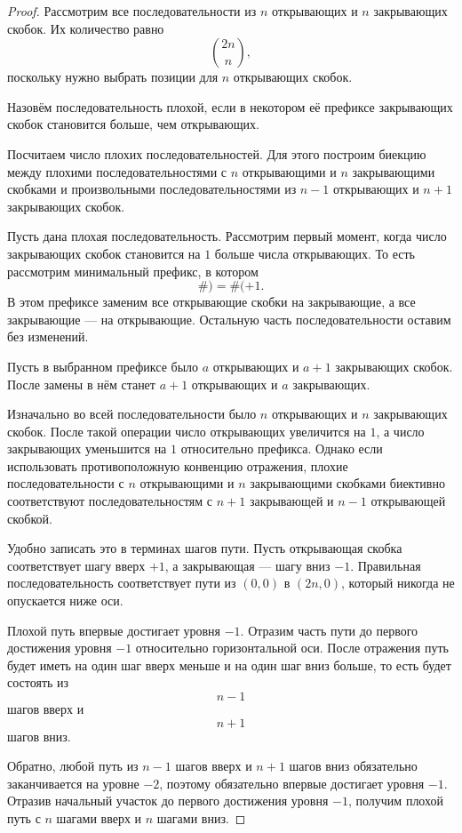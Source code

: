 \documentclass[12pt,a4paper]{article}
\begin{document}
\begin{proof}
Рассмотрим все последовательности из $n$ открывающих и $n$ закрывающих скобок. Их количество равно
\[
\binom{2n}{n},
\]
поскольку нужно выбрать позиции для $n$ открывающих скобок.

Назовём последовательность плохой, если в некотором её префиксе закрывающих скобок становится больше, чем открывающих.

Посчитаем число плохих последовательностей. Для этого построим биекцию между плохими последовательностями с $n$ открывающими и $n$ закрывающими скобками и произвольными последовательностями из $n-1$ открывающих и $n+1$ закрывающих скобок.

Пусть дана плохая последовательность. Рассмотрим первый момент, когда число закрывающих скобок становится на $1$ больше числа открывающих. То есть рассмотрим минимальный префикс, в котором
\[
\#)=\#(+1.
\]
В этом префиксе заменим все открывающие скобки на закрывающие, а все закрывающие --- на открывающие. Остальную часть последовательности оставим без изменений.

Пусть в выбранном префиксе было $a$ открывающих и $a+1$ закрывающих скобок. После замены в нём станет $a+1$ открывающих и $a$ закрывающих.

Изначально во всей последовательности было $n$ открывающих и $n$ закрывающих скобок. После такой операции число открывающих увеличится на $1$, а число закрывающих уменьшится на $1$ относительно префикса. Однако если использовать противоположную конвенцию отражения, плохие последовательности с $n$ открывающими и $n$ закрывающими скобками биективно соответствуют последовательностям с $n+1$ закрывающей и $n-1$ открывающей скобкой.

Удобно записать это в терминах шагов пути. Пусть открывающая скобка соответствует шагу вверх $+1$, а закрывающая --- шагу вниз $-1$. Правильная последовательность соответствует пути из $(0,0)$ в $(2n,0)$, который никогда не опускается ниже оси.

Плохой путь впервые достигает уровня $-1$. Отразим часть пути до первого достижения уровня $-1$ относительно горизонтальной оси. После отражения путь будет иметь на один шаг вверх меньше и на один шаг вниз больше, то есть будет состоять из
\[
n-1
\]
шагов вверх и
\[
n+1
\]
шагов вниз.

Обратно, любой путь из $n-1$ шагов вверх и $n+1$ шагов вниз обязательно заканчивается на уровне $-2$, поэтому обязательно впервые достигает уровня $-1$. Отразив начальный участок до первого достижения уровня $-1$, получим плохой путь с $n$ шагами вверх и $n$ шагами вниз.


\end{proof}
\end{document}
